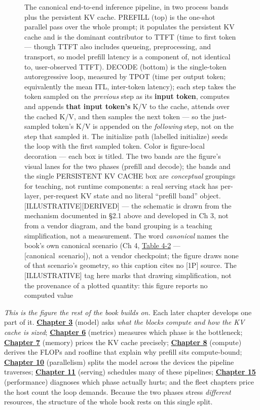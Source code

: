 \begin{figure}
\caption[The canonical end-to-end inference pipeline]{The canonical end-to-end inference pipeline, in two process bands plus the persistent KV cache. PREFILL (top) is the one-shot parallel pass over the whole prompt; it populates the persistent KV cache and is the dominant contributor to TTFT (time to first token --- though TTFT also includes queueing, preprocessing, and transport, so model prefill latency is a component of, not identical to, user-observed TTFT). DECODE (bottom) is the single-token autoregressive loop, measured by TPOT (time per output token; equivalently the mean ITL, inter-token latency); each step takes the token sampled on the \emph{previous} step as its \textbf{input token}, computes and appends \textbf{that input token's} K/V to the cache, attends over the cached K/V, and then samples the next token --- so the just-sampled token's K/V is appended on the \emph{following} step, not on the step that sampled it. The initialize path (labelled initialize) seeds the loop with the first sampled token. Color is figure-local decoration --- each box is titled. The two bands are the figure's visual lanes for the two phases (prefill and decode); the bands and the single PERSISTENT KV CACHE box are \emph{conceptual} groupings for teaching, not runtime components: a real serving stack has per-layer, per-request KV state and no literal ``prefill band'' object. \mbox{{[}ILLUSTRATIVE{]}}\hspace{0pt}\mbox{{[}DERIVED{]}} --- the schematic is drawn from the mechanism documented in §2.1 above and developed in Ch 3, not from a vendor diagram, and the band grouping is a teaching simplification, not a measurement. The word \emph{canonical} names the book's own canonical scenario (Ch 4, \hyperref[tab:4.2]{Table 4-2} --- \mbox{{[}canonical scenario{]}}), not a vendor checkpoint; the figure draws none of that scenario's geometry, so this caption cites no \mbox{{[}1P{]}} source. The \mbox{{[}ILLUSTRATIVE{]}} tag here marks that drawing simplification, not the provenance of a plotted quantity: this figure reports no computed value}

\label{fig:2.1}\end{figure}


\emph{This is the figure the rest of the book builds on.} Each later
chapter develops one part of it. \textbf{\hyperref[chap:3]{Chapter 3}} (model) asks
\emph{what the blocks compute and how the KV cache is sized};
\textbf{\hyperref[chap:6]{Chapter 6}} (metrics) measures which phase is the bottleneck;
\textbf{\hyperref[chap:7]{Chapter 7}} (memory) prices the KV cache precisely;
\textbf{\hyperref[chap:8]{Chapter 8}} (compute) derives the FLOPs and roofline that explain
why prefill sits compute-bound; \textbf{\hyperref[chap:10]{Chapter 10}} (parallelism) splits
the model across the devices the pipeline traverses; \textbf{\hyperref[chap:11]{Chapter 11}}
(serving) schedules many of these pipelines; \textbf{\hyperref[chap:15]{Chapter 15}}
(performance) diagnoses which phase actually hurts; and the fleet
chapters price the host count the loop demands. Because the two phases
stress \emph{different} resources, the structure of the whole book rests
on this single split.

